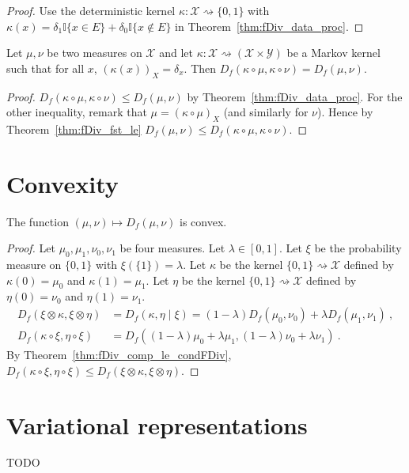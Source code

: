 \begin{proof}
Use the deterministic kernel $\kappa : \mathcal X \rightsquigarrow \{0, 1\}$ with $\kappa(x) = \delta_1 \mathbb{I}\{x \in E\} + \delta_0 \mathbb{I}\{x \notin E\}$ in Theorem~\ref{thm:fDiv_data_proc}.
\end{proof}

\begin{lemma}
  \label{lem:fDiv_compProd_prod_eq}
  Let $\mu, \nu$ be two measures on $\mathcal X$ and let $\kappa : \mathcal X \rightsquigarrow (\mathcal X \times \mathcal Y)$ be a Markov kernel such that for all $x$, $(\kappa(x))_X = \delta_x$. Then $D_f(\kappa \circ \mu, \kappa \circ \nu) = D_f(\mu, \nu)$.
\end{lemma}

\begin{proof}
$D_f(\kappa \circ \mu, \kappa \circ \nu) \le D_f(\mu, \nu)$ by Theorem~\ref{thm:fDiv_data_proc}.
For the other inequality, remark that $\mu = (\kappa \circ \mu)_X$ (and similarly for $\nu$). Hence by Theorem~\ref{thm:fDiv_fst_le} $D_f(\mu, \nu) \le D_f(\kappa \circ \mu, \kappa \circ \nu)$.
\end{proof}

\section{Convexity}

\begin{theorem}
  \label{thm:fDiv_convex}
  The function $(\mu, \nu) \mapsto D_f(\mu, \nu)$ is convex.
\end{theorem}

\begin{proof}
Let $\mu_0, \mu_1, \nu_0, \nu_1$ be four measures. Let $\lambda \in [0,1]$. Let $\xi$ be the probability measure on $\{0,1\}$ with $\xi(\{1\}) = \lambda$.
Let $\kappa$ be the kernel $\{0,1\} \rightsquigarrow \mathcal X$ defined by $\kappa(0) = \mu_0$ and $\kappa(1) = \mu_1$.
Let $\eta$ be the kernel $\{0,1\} \rightsquigarrow \mathcal X$ defined by $\eta(0) = \nu_0$ and $\eta(1) = \nu_1$.
\begin{align*}
D_f(\xi \otimes \kappa, \xi \otimes \eta)
&= D_f(\kappa, \eta \mid \xi)
= (1 - \lambda) D_f(\mu_0, \nu_0) + \lambda D_f(\mu_1, \nu_1)
\: , \\
D_f(\kappa \circ \xi, \eta \circ \xi)
&= D_f((1 - \lambda)\mu_0 + \lambda \mu_1, (1 - \lambda)\nu_0 + \lambda \nu_1)
\: .
\end{align*}
By Theorem~\ref{thm:fDiv_comp_le_condFDiv}, $D_f(\kappa \circ \xi, \eta \circ \xi) \le D_f(\xi \otimes \kappa, \xi \otimes \eta)$.
\end{proof}

\section{Variational representations}

TODO